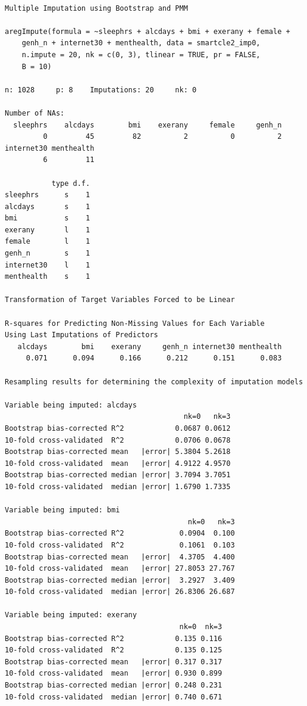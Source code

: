 \documentclass[]{book}
\theoremstyle{definition}
\theoremstyle{definition}
\theoremstyle{definition}
\theoremstyle{remark}
\begin{document}
\begin{verbatim}

Multiple Imputation using Bootstrap and PMM

aregImpute(formula = ~sleephrs + alcdays + bmi + exerany + female + 
    genh_n + internet30 + menthealth, data = smartcle2_imp0, 
    n.impute = 20, nk = c(0, 3), tlinear = TRUE, pr = FALSE, 
    B = 10)

n: 1028     p: 8    Imputations: 20     nk: 0 

Number of NAs:
  sleephrs    alcdays        bmi    exerany     female     genh_n 
         0         45         82          2          0          2 
internet30 menthealth 
         6         11 

           type d.f.
sleephrs      s    1
alcdays       s    1
bmi           s    1
exerany       l    1
female        l    1
genh_n        s    1
internet30    l    1
menthealth    s    1

Transformation of Target Variables Forced to be Linear

R-squares for Predicting Non-Missing Values for Each Variable
Using Last Imputations of Predictors
   alcdays        bmi    exerany     genh_n internet30 menthealth 
     0.071      0.094      0.166      0.212      0.151      0.083 

Resampling results for determining the complexity of imputation models

Variable being imputed: alcdays 
                                          nk=0   nk=3
Bootstrap bias-corrected R^2            0.0687 0.0612
10-fold cross-validated  R^2            0.0706 0.0678
Bootstrap bias-corrected mean   |error| 5.3804 5.2618
10-fold cross-validated  mean   |error| 4.9122 4.9570
Bootstrap bias-corrected median |error| 3.7094 3.7051
10-fold cross-validated  median |error| 1.6790 1.7335

Variable being imputed: bmi 
                                           nk=0   nk=3
Bootstrap bias-corrected R^2             0.0904  0.100
10-fold cross-validated  R^2             0.1061  0.103
Bootstrap bias-corrected mean   |error|  4.3705  4.400
10-fold cross-validated  mean   |error| 27.8053 27.767
Bootstrap bias-corrected median |error|  3.2927  3.409
10-fold cross-validated  median |error| 26.8306 26.687

Variable being imputed: exerany 
                                         nk=0  nk=3
Bootstrap bias-corrected R^2            0.135 0.116
10-fold cross-validated  R^2            0.135 0.125
Bootstrap bias-corrected mean   |error| 0.317 0.317
10-fold cross-validated  mean   |error| 0.930 0.899
Bootstrap bias-corrected median |error| 0.248 0.231
10-fold cross-validated  median |error| 0.740 0.671


\end{verbatim}
\end{document}
